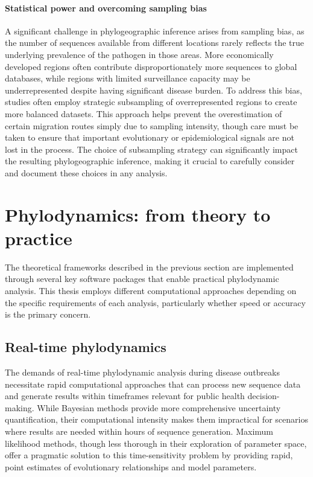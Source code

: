 \paragraph*{Statistical power and overcoming sampling bias}
A significant challenge in phylogeographic inference arises from sampling bias, as the number of sequences available from different locations rarely reflects the true underlying prevalence of the pathogen in those areas.
More economically developed regions often contribute disproportionately more sequences to global databases, while regions with limited surveillance capacity may be underrepresented despite having significant disease burden.
To address this bias, studies often employ strategic subsampling of overrepresented regions to create more balanced datasets.
This approach helps prevent the overestimation of certain migration routes simply due to sampling intensity, though care must be taken to ensure that important evolutionary or epidemiological signals are not lost in the process.
The choice of subsampling strategy can significantly impact the resulting phylogeographic inference, making it crucial to carefully consider and document these choices in any analysis.

\section{Phylodynamics: from theory to practice}
The theoretical frameworks described in the previous section are implemented through several key software packages that enable practical phylodynamic analysis.
This thesis employs different computational approaches depending on the specific requirements of each analysis, particularly whether speed or accuracy is the primary concern.

\subsection{Real-time phylodynamics}
The demands of real-time phylodynamic analysis during disease outbreaks necessitate rapid computational approaches that can process new sequence data and generate results within timeframes relevant for public health decision-making.
While Bayesian methods provide more comprehensive uncertainty quantification, their computational intensity makes them impractical for scenarios where results are needed within hours of sequence generation.
Maximum likelihood methods, though less thorough in their exploration of parameter space, offer a pragmatic solution to this time-sensitivity problem by providing rapid, point estimates of evolutionary relationships and model parameters.

